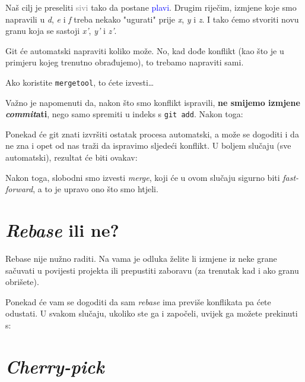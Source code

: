 

Naš cilj je preseliti \textcolor{gray}{sivi} tako da postane \textcolor{blue}{plavi}.
Drugim riječim, izmjene koje smo napravili u \emph d, \emph e i \emph f treba nekako "ugurati" prije \emph x, \emph y i \emph z.
I tako ćemo stvoriti novu granu koja se sastoji \emph{x'}, \emph{y'} i \emph{z'}.

Git će automatski napraviti koliko može.
No, kad dođe konflikt (kao što je u primjeru kojeg trenutno obrađujemo), to trebamo napraviti sami.

Ako koristite \verb+mergetool+, to ćete izvesti\dots



Važno je napomenuti da, nakon što smo konflikt ispravili, \textbf{ne smijemo izmjene \emph{commit}ati}, nego samo spremiti u indeks s \verb+git add+.
Nakon toga:


Ponekad će git znati izvršiti ostatak procesa automatski, a može se dogoditi i da ne zna i opet od nas traži da ispravimo sljedeći konflikt.
U boljem slučaju (sve automatski), rezultat će biti ovakav:



Nakon toga, slobodni smo izvesti \emph{merge}, koji će u ovom slučaju sigurno biti \emph{fast-forward}, a to je upravo ono što smo htjeli.

\section*{\emph{Rebase} ili ne?}

Rebase nije nužno raditi.
Na vama je odluka želite li izmjene iz neke grane sačuvati u povijesti projekta ili prepustiti zaboravu (za trenutak kad i ako granu obrišete).

Ponekad će vam se dogoditi da sam \emph{rebase} ima previše konflikata pa ćete odustati.
U svakom slučaju, ukoliko ste ga i započeli, uvijek ga možete prekinuti s:


\section*{\emph{Cherry-pick}}

